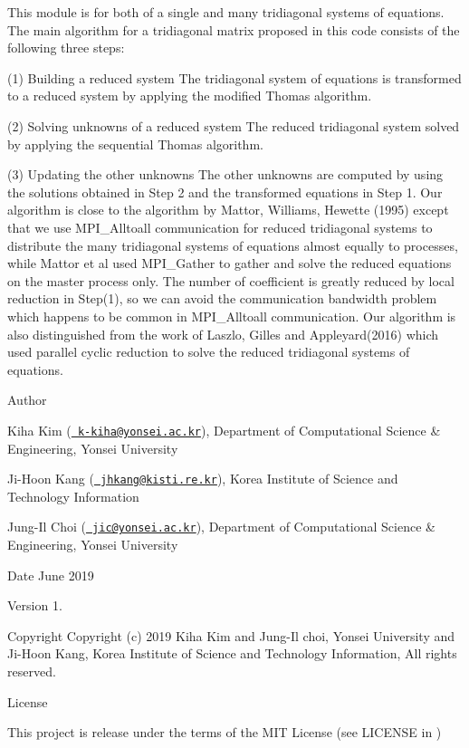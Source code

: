 This module is for both of a single and many tridiagonal systems of equations. The main algorithm for a tridiagonal matrix proposed in this code consists of the following three steps\+:
\begin{DoxyItemize}
\item (1) Building a reduced system The tridiagonal system of equations is transformed to a reduced system by applying the modified Thomas algorithm.
\item (2) Solving unknowns of a reduced system The reduced tridiagonal system solved by applying the sequential Thomas algorithm.
\item (3) Updating the other unknowns The other unknowns are computed by using the solutions obtained in Step 2 and the transformed equations in Step 1. Our algorithm is close to the algorithm by Mattor, Williams, Hewette (1995) except that we use M\+P\+I\+\_\+\+Alltoall communication for reduced tridiagonal systems to distribute the many tridiagonal systems of equations almost equally to processes, while Mattor et al used M\+P\+I\+\_\+\+Gather to gather and solve the reduced equations on the master process only. The number of coefficient is greatly reduced by local reduction in Step(1), so we can avoid the communication bandwidth problem which happens to be common in M\+P\+I\+\_\+\+Alltoall communication. Our algorithm is also distinguished from the work of Laszlo, Gilles and Appleyard(2016) which used parallel cyclic reduction to solve the reduced tridiagonal systems of equations. \begin{DoxyAuthor}{Author}

\end{DoxyAuthor}

\item Kiha Kim (\href{mailto:k-kiha@yonsei.ac.kr}{\texttt{ k-\/kiha@yonsei.\+ac.\+kr}}), Department of Computational Science \& Engineering, Yonsei University
\item Ji-\/\+Hoon Kang (\href{mailto:jhkang@kisti.re.kr}{\texttt{ jhkang@kisti.\+re.\+kr}}), Korea Institute of Science and Technology Information
\item Jung-\/\+Il Choi (\href{mailto:jic@yonsei.ac.kr}{\texttt{ jic@yonsei.\+ac.\+kr}}), Department of Computational Science \& Engineering, Yonsei University
\end{DoxyItemize}

\begin{DoxyDate}{Date}
June 2019 
\end{DoxyDate}
\begin{DoxyVersion}{Version}
1. 
\end{DoxyVersion}
\begin{DoxyParagraph}{Copyright}
Copyright (c) 2019 Kiha Kim and Jung-\/\+Il choi, Yonsei University and Ji-\/\+Hoon Kang, Korea Institute of Science and Technology Information, All rights reserved. 
\end{DoxyParagraph}
\begin{DoxyParagraph}{License }

\end{DoxyParagraph}
This project is release under the terms of the M\+IT License (see L\+I\+C\+E\+N\+SE in ) 